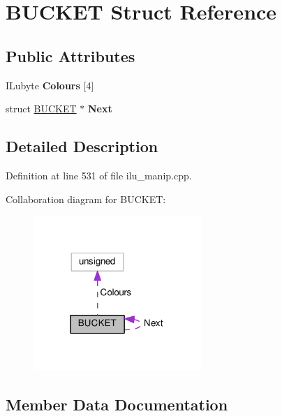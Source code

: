 \hypertarget{structBUCKET}{}\section{B\+U\+C\+K\+ET Struct Reference}
\label{structBUCKET}
\subsection*{Public Attributes}
\begin{DoxyCompactItemize}
\item 
\mbox{\label{structBUCKET_a918ae46de76a73b7e89feb0f1cc0e58f}} 
I\+Lubyte {\bfseries Colours} \mbox{[}4\mbox{]}
\item 
\mbox{\label{structBUCKET_ac7c0f708d5b1174db140657e01bf8a54}} 
struct \hyperlink{structBUCKET}{B\+U\+C\+K\+ET} $\ast$ {\bfseries Next}
\end{DoxyCompactItemize}


\subsection{Detailed Description}


Definition at line 531 of file ilu\+\_\+manip.\+cpp.



Collaboration diagram for B\+U\+C\+K\+ET\+:
\nopagebreak
\begin{figure}[H]
\begin{center}
\leavevmode
\includegraphics[width=181pt]{df/d3f/structBUCKET__coll__graph}
\end{center}
\end{figure}


\subsection{Member Data Documentation}
\mbox{\label{structBUCKET_a918ae46de76a73b7e89feb0f1cc0e58f}} 
